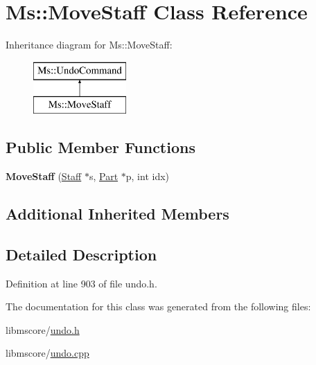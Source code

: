 \hypertarget{class_ms_1_1_move_staff}{}\section{Ms\+:\+:Move\+Staff Class Reference}
\label{class_ms_1_1_move_staff}
Inheritance diagram for Ms\+:\+:Move\+Staff\+:\begin{figure}[H]
\begin{center}
\leavevmode
\includegraphics[height=2.000000cm]{class_ms_1_1_move_staff}
\end{center}
\end{figure}
\subsection*{Public Member Functions}
\begin{DoxyCompactItemize}
\item 
\mbox{\label{class_ms_1_1_move_staff_a0bce0b0a663fe48bb9a243441ca7ddd6}} 
{\bfseries Move\+Staff} (\hyperlink{class_ms_1_1_staff}{Staff} $\ast$s, \hyperlink{class_ms_1_1_part}{Part} $\ast$p, int idx)
\end{DoxyCompactItemize}
\subsection*{Additional Inherited Members}


\subsection{Detailed Description}


Definition at line 903 of file undo.\+h.



The documentation for this class was generated from the following files\+:\begin{DoxyCompactItemize}
\item 
libmscore/\hyperlink{undo_8h}{undo.\+h}\item 
libmscore/\hyperlink{undo_8cpp}{undo.\+cpp}\end{DoxyCompactItemize}
